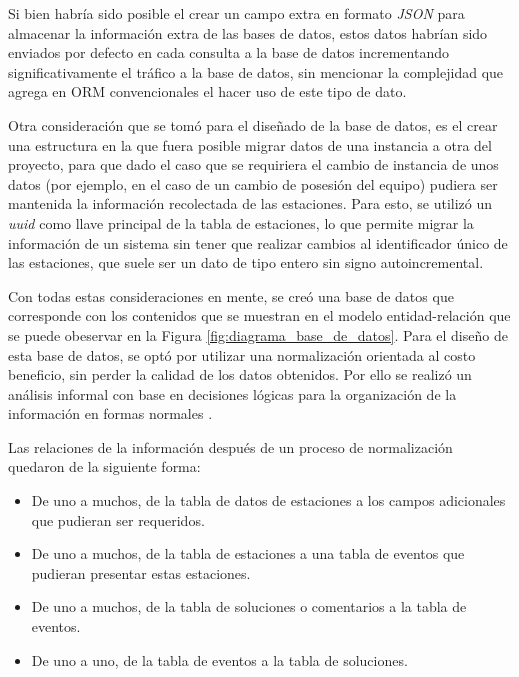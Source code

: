 Si bien habría sido posible el crear un campo extra en formato \textit{JSON} para almacenar la información extra de las bases de datos, estos datos habrían sido enviados por defecto en cada consulta a la base de datos incrementando significativamente el tráfico a la base de datos, sin mencionar la complejidad que agrega en ORM convencionales el hacer uso de este tipo de dato.

Otra consideración que se tomó para el diseñado de la base de datos, es el crear una estructura en la que fuera posible migrar datos de una instancia a otra del proyecto, para que dado el caso que se requiriera el cambio de instancia de unos datos (por ejemplo, en el caso de un cambio de posesión del equipo) pudiera ser mantenida la información recolectada de las estaciones. Para esto, se utilizó un \textit{uuid} como llave principal de la tabla de estaciones, lo que permite migrar la información de un sistema sin tener que realizar cambios al identificador único de las estaciones, que suele ser un dato de tipo entero sin signo autoincremental.

Con todas estas consideraciones en mente, se creó una base de datos que corresponde con los contenidos que se muestran en el modelo entidad-relación que se puede obeservar en la Figura \ref{fig:diagrama_base_de_datos}. Para el diseño de esta base de datos, se optó por utilizar una normalización orientada al costo beneficio, sin perder la calidad de los datos obtenidos. Por ello se realizó un análisis informal con base en decisiones lógicas para la organización de la información en formas normales \cite{justifying_normalization_lee}.

Las relaciones de la información después de un proceso de normalización quedaron de la siguiente forma:

\begin{itemize}
   \item De uno a muchos, de la tabla de datos de estaciones a los campos adicionales que pudieran ser requeridos.
   \item De uno a muchos, de la tabla de estaciones a una tabla de eventos que pudieran presentar estas estaciones.
   \item De uno a muchos, de la tabla de soluciones o comentarios a la tabla de eventos.
   \item De uno a uno, de la tabla de eventos a la tabla de soluciones.
\end{itemize}

